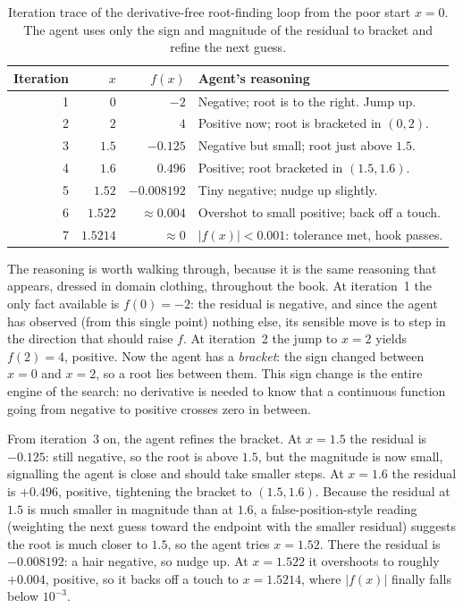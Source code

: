\begin{table}[t]
  \centering
  \begin{tabular}{@{}rrrl@{}}
    \toprule
    Iteration & $x$ & $f(x)$ & Agent's reasoning \\
    \midrule
    1 & $0$      & $-2$        & Negative; root is to the right. Jump up. \\
    2 & $2$      & $4$         & Positive now; root is bracketed in $(0,2)$. \\
    3 & $1.5$    & $-0.125$    & Negative but small; root just above $1.5$. \\
    4 & $1.6$    & $0.496$     & Positive; root bracketed in $(1.5,1.6)$. \\
    5 & $1.52$   & $-0.008192$ & Tiny negative; nudge up slightly. \\
    6 & $1.522$  & $\approx 0.004$ & Overshot to small positive; back off a touch. \\
    7 & $1.5214$ & $\approx 0$ & $|f(x)| < 0.001$: tolerance met, hook passes. \\
    \bottomrule
  \end{tabular}
  \caption{Iteration trace of the derivative-free root-finding loop from the poor
  start $x=0$. The agent uses only the sign and magnitude of the residual to
  bracket and refine the next guess.}
  \label{tab:rootfind-trace}
\end{table}

The reasoning is worth walking through, because it is the same reasoning that
appears, dressed in domain clothing, throughout the book. At iteration~1 the only
fact available is $f(0)=-2$: the residual is negative, and since the agent has
observed (from this single point) nothing else, its sensible move is to step in
the direction that should raise $f$. At iteration~2 the jump to $x=2$ yields
$f(2)=4$, positive. Now the agent has a \emph{bracket}: the sign changed between
$x=0$ and $x=2$, so a root lies between them. This sign change is the entire
engine of the search: no derivative is needed to know that a continuous function
going from negative to positive crosses zero in between.

From iteration~3 on, the agent refines the bracket. At $x=1.5$ the residual is
$-0.125$: still negative, so the root is above $1.5$, but the magnitude is now
small, signalling the agent is close and should take smaller steps. At $x=1.6$ the
residual is $+0.496$, positive, tightening the bracket to $(1.5,1.6)$. Because the
residual at $1.5$ is much smaller in magnitude than at $1.6$, a
false-position-style reading (weighting the next guess toward the endpoint with
the smaller residual) suggests the root is much closer to $1.5$, so the agent
tries $x=1.52$. There the residual is $-0.008192$: a hair negative, so nudge up.
At $x=1.522$ it overshoots to roughly $+0.004$, positive, so it backs off a touch
to $x=1.5214$, where $|f(x)|$ finally falls below $10^{-3}$.

